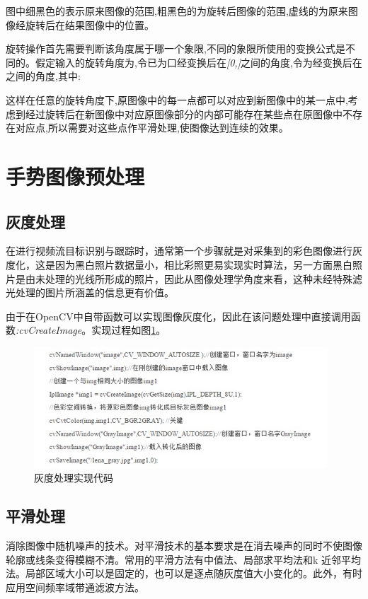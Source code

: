 \documentclass{XDBAthesis}
\begin{document}
图中细黑色的表示原来图像的范围,粗黑色的为旋转后图像的范围,虚线的为原来图像经旋转后在结果图像中的位置。

旋转操作首先需要判断该角度属于哪一个象限,不同的象限所使用的变换公式是不同的。假定输入的旋转角度为,令已为口经变换后在\emph{[0,]}之间的角度,令为经变换后在之间的角度,其中:


这样在任意的旋转角度下,原图像中的每一点都可以对应到新图像中的某一点中,考虑到经过旋转后在新图像中对应原图像部分的内部可能存在某些点在原图像中不存在对应点,所以需要对这些点作平滑处理,使图像达到连续的效果。

\section{手势图像预处理}

\subsection{灰度处理}

在进行视频流目标识别与跟踪时，通常第一个步骤就是对采集到的彩色图像进行灰度化，这是因为黑白照片数据量小，相比彩照更易实现实时算法，另一方面黑白照片是由未处理的光线所形成的照片，因此从图像处理学角度来看，这种未经特殊滤光处理的图片所涵盖的信息更有价值。

由于在OpenCV中自带函数可以实现图像灰度化，因此在该问题处理中直接调用函数\emph{:cvCreateImage}。实现过程如图\ref{fg:hui}。

 \begin{figure}[htb]
    \centering
    \includegraphics[width=\textwidth]{figure/hui}
    \caption{灰度处理实现代码}
    \label{fg:hui}
\end{figure}

\subsection{平滑处理}

消除图像中随机噪声的技术。对平滑技术的基本要求是在消去噪声的同时不使图像轮廓或线条变得模糊不清。常用的平滑方法有中值法、局部求平均法和k 近邻平均法。局部区域大小可以是固定的，也可以是逐点随灰度值大小变化的。此外，有时应用空间频率域带通滤波方法。
\end{document}
